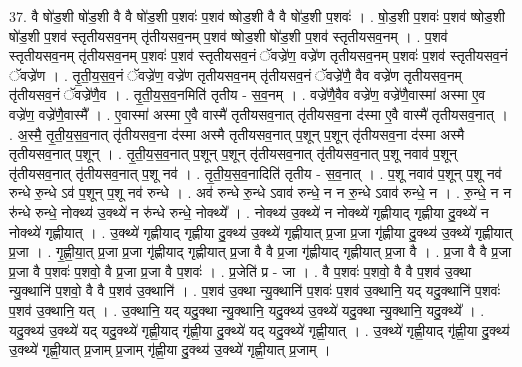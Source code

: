 \documentclass[17pt]{extarticle}
\begin{document}
37. वै षो॑ड॒शी षो॑ड॒शी वै वै षो॑ड॒शी प॒शवः॑ प॒शव॑ ष्षोड॒शी वै वै षो॑ड॒शी प॒शवः॑ । . षो॒ड॒शी प॒शवः॑ प॒शव॑ ष्षोड॒शी षो॑ड॒शी प॒शव॑ स्तृतीयसव॒नम् तृ॑तीयसव॒नम् प॒शव॑ ष्षोड॒शी षो॑ड॒शी प॒शव॑ स्तृतीयसव॒नम् । . प॒शव॑ स्तृतीयसव॒नम् तृ॑तीयसव॒नम् प॒शवः॑ प॒शव॑ स्तृतीयसव॒नं ॅवज्रे॑ण॒ वज्रे॑ण तृतीयसव॒नम् प॒शवः॑ प॒शव॑ स्तृतीयसव॒नं ॅवज्रे॑ण । . तृ॒ती॒य॒स॒व॒नं ॅवज्रे॑ण॒ वज्रे॑ण तृतीयसव॒नम् तृ॑तीयसव॒नं ॅवज्रे॑णै॒ वैव वज्रे॑ण तृतीयसव॒नम् तृ॑तीयसव॒नं ॅवज्रे॑णै॒व । . तृ॒ती॒य॒स॒व॒नमिति॑ तृतीय - स॒व॒नम् । . वज्रे॑णै॒वैव वज्रे॑ण॒ वज्रे॑णै॒वास्मा॑ अस्मा ए॒व वज्रे॑ण॒ वज्रे॑णै॒वास्मै᳚ । . ए॒वास्मा॑ अस्मा ए॒वै वास्मै॑ तृतीयसव॒नात् तृ॑तीयसव॒ना द॑स्मा ए॒वै वास्मै॑ तृतीयसव॒नात् । . अ॒स्मै॒ तृ॒ती॒य॒स॒व॒नात् तृ॑तीयसव॒ना द॑स्मा अस्मै तृतीयसव॒नात् प॒शून् प॒शून् तृ॑तीयसव॒ना द॑स्मा अस्मै तृतीयसव॒नात् प॒शून् । . तृ॒ती॒य॒स॒व॒नात् प॒शून् प॒शून् तृ॑तीयसव॒नात् तृ॑तीयसव॒नात् प॒शू नवाव॑ प॒शून् तृ॑तीयसव॒नात् तृ॑तीयसव॒नात् प॒शू नव॑ । . तृ॒ती॒य॒स॒व॒नादिति॑ तृतीय - स॒व॒नात् । . प॒शू नवाव॑ प॒शून् प॒शू नव॑ रुन्धे रु॒न्धे ऽव॑ प॒शून् प॒शू नव॑ रुन्धे । . अव॑ रुन्धे रु॒न्धे ऽवाव॑ रुन्धे॒ न न रु॒न्धे ऽवाव॑ रुन्धे॒ न । . रु॒न्धे॒ न न रु॑न्धे रुन्धे॒ नोक्थ्य॑ उ॒क्थ्ये॑ न रु॑न्धे रुन्धे॒ नोक्थ्ये᳚ । . नोक्थ्य॑ उ॒क्थ्ये॑ न नोक्थ्ये॑ गृह्णीयाद् गृह्णीया दु॒क्थ्ये॑ न नोक्थ्ये॑ गृह्णीयात् । . उ॒क्थ्ये॑ गृह्णीयाद् गृह्णीया दु॒क्थ्य॑ उ॒क्थ्ये॑ गृह्णीयात् प्र॒जा प्र॒जा गृ॑ह्णीया दु॒क्थ्य॑ उ॒क्थ्ये॑ गृह्णीयात् प्र॒जा । . गृ॒ह्णी॒या॒त् प्र॒जा प्र॒जा गृ॑ह्णीयाद् गृह्णीयात् प्र॒जा वै वै प्र॒जा गृ॑ह्णीयाद् गृह्णीयात् प्र॒जा वै । . प्र॒जा वै वै प्र॒जा प्र॒जा वै प॒शवः॑ प॒शवो॒ वै प्र॒जा प्र॒जा वै प॒शवः॑ । . प्र॒जेति॑ प्र - जा । . वै प॒शवः॑ प॒शवो॒ वै वै प॒शव॑ उ॒क्था न्यु॒क्थानि॑ प॒शवो॒ वै वै प॒शव॑ उ॒क्थानि॑ । . प॒शव॑ उ॒क्था न्यु॒क्थानि॑ प॒शवः॑ प॒शव॑ उ॒क्थानि॒ यद् यदु॒क्थानि॑ प॒शवः॑ प॒शव॑ उ॒क्थानि॒ यत् । . उ॒क्थानि॒ यद् यदु॒क्था न्यु॒क्थानि॒ यदु॒क्थ्य॑ उ॒क्थ्ये॑ यदु॒क्था न्यु॒क्थानि॒ यदु॒क्थ्ये᳚ । . यदु॒क्थ्य॑ उ॒क्थ्ये॑ यद् यदु॒क्थ्ये॑ गृह्णी॒याद् गृ॑ह्णी॒या दु॒क्थ्ये॑ यद् यदु॒क्थ्ये॑ गृह्णी॒यात् । . उ॒क्थ्ये॑ गृह्णी॒याद् गृ॑ह्णी॒या दु॒क्थ्य॑ उ॒क्थ्ये॑ गृह्णी॒यात् प्र॒जाम् प्र॒जाम् गृ॑ह्णी॒या दु॒क्थ्य॑ उ॒क्थ्ये॑ गृह्णी॒यात् प्र॒जाम् । \newline
\pagebreak
{}
\end{document}
